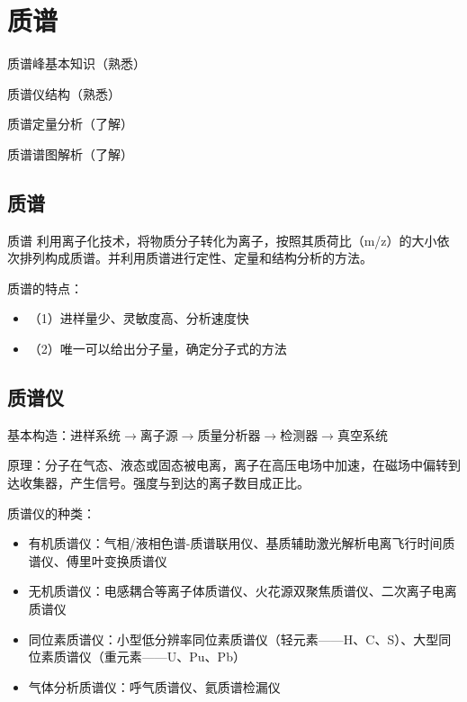 \chapter{质谱}
\begin{introduction}
    \item 质谱峰基本知识（熟悉）
    \item 质谱仪结构（熟悉）
    \item 质谱定量分析（了解）
    \item 质谱谱图解析（了解）
\end{introduction}
\section{质谱}
\begin{definition*}{质谱}
    利用离子化技术，将物质分子转化为离子，按照其质荷比（m/z）的大小依次排列构成质谱。并利用质谱进行定性、定量和结构分析的方法。
\end{definition*}
质谱的特点：
\begin{itemize}
    \item （1）进样量少、灵敏度高、分析速度快
    \item （2）唯一可以给出分子量，确定分子式的方法
\end{itemize}


\section{质谱仪}

基本构造：进样系统$\rightarrow$离子源$\rightarrow$质量分析器$\rightarrow$检测器$\rightarrow$真空系统

原理：分子在气态、液态或固态被电离，离子在高压电场中加速，在磁场中偏转到达收集器，产生信号。强度与到达的离子数目成正比。

质谱仪的种类：
\begin{itemize}
    \item 有机质谱仪：气相/液相色谱-质谱联用仪、基质辅助激光解析电离飞行时间质谱仪、傅里叶变换质谱仪
    \item 无机质谱仪：电感耦合等离子体质谱仪、火花源双聚焦质谱仪、二次离子电离质谱仪
    \item 同位素质谱仪：小型低分辨率同位素质谱仪（轻元素——H、C、S）、大型同位素质谱仪（重元素——U、Pu、Pb）
    \item 气体分析质谱仪：呼气质谱仪、氦质谱检漏仪
\end{itemize}
